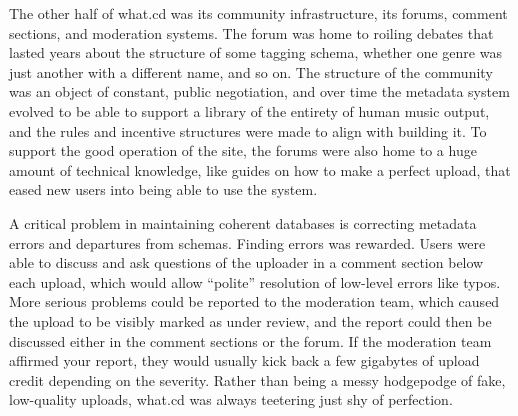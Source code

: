\documentclass[nohyper]{tufte-book-jls}
\begin{document}
The other half of what.cd was its community infrastructure, its forums,
comment sections, and moderation systems. The forum was home to roiling
debates that lasted years about the structure of some tagging schema,
whether one genre was just another with a different name, and so on. The
structure of the community was an object of constant, public
negotiation, and over time the metadata system evolved to be able to
support a library of the entirety of human music output, and the rules and incentive structures
were made to align with building it. To support the good operation of
the site, the forums were also home to a huge amount of technical
knowledge, like guides on how to make a perfect upload, that eased new
users into being able to use the system.

A critical problem in maintaining coherent databases is correcting
metadata errors and departures from schemas. Finding errors was
rewarded. Users were able to discuss and ask questions of the uploader
in a comment section below each upload, which would allow ``polite''
resolution of low-level errors like typos. More serious problems could
be reported to the moderation team, which caused the upload to be
visibly marked as under review, and the report could then be discussed
either in the comment sections or the forum. If the moderation team
affirmed your report, they would usually kick back a few gigabytes of
upload credit depending on the severity. Rather than being a messy
hodgepodge of fake, low-quality uploads, what.cd was always teetering
just shy of perfection.
\end{document}
